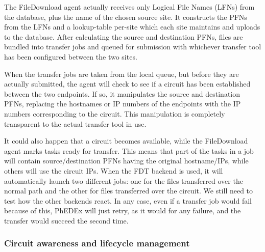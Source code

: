
The FileDownload agent actually receives only Logical File Names (LFNs) from the database, plus the name of the chosen source site. It constructs the PFNs from the LFNs and a lookup-table per-site which each site maintains and uploads to the database. After calculating the source and destination PFNs, files are bundled into transfer jobs and queued for submission with whichever transfer tool has been configured between the two sites.

When the transfer jobs are taken from the local queue, but before they are actually submitted, the agent will check to see if a circuit has been established between the two endpoints. If so, it manipulates the source and destination PFNs, replacing the hostnames or IP numbers of the endpoints with the IP numbers corresponding to the circuit. This manipulation is completely transparent to the actual transfer tool in use.

It could also happen that a circuit becomes available, while the FileDownload agent
marks tasks ready for transfer. This means that part of the tasks in a job
will contain source/destination PFNs having the original hostname/IPs, while
others will use the circuit IPs. When the FDT backend is used, it will automatically
launch two different jobs: one for the files transferred over the normal path
and the other for files transferred over the circuit. We still need to test
how the other backends react. In any case, even if a transfer job would fail 
because of this, PhEDEx will just retry, as it would for any failure, and the transfer would succeed the second
time.

\subsubsection{Circuit awareness and lifecycle management}

